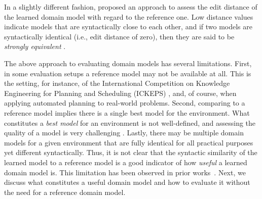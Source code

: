 \documentclass{article}
\theoremstyle{definition}
\theoremstyle{remark}
\newif\ifaddcomments
\newcommand{\roni}[1]{\ifaddcomments{\textcolor{red}{[Roni: #1]}}\fi}
\newcommand{\mauro}[1]{\ifaddcomments{\textcolor{green}{[Mauro: #1]}}\fi}
\begin{document}


In a slightly different fashion, \cite{chrpa2023comparing} proposed an approach to assess the edit distance of the learned domain model with regard to the reference one. Low distance values indicate models that are syntactically close to each other, and if two models are syntactically identical (i.e., edit distance of zero), then they are said to be \textit{strongly equivalent} \citep{chrpa2023comparing}.



The above approach to evaluating domain models has several limitations. 
First, in some evaluation setups a reference model may not be available at all. 
This is the setting, for instance, of the International Competition on Knowledge Engineering for Planning and Scheduling (ICKEPS) \citep{DBLP:journals/aim/ChrpaMVV17}, 
and, of course, when applying automated planning to real-world problems.
Second, comparing to a reference model implies there is a single best model for the environment. 
What constitutes a \emph{best model} for an environment is not well-defined, and assessing the quality of a model is very challenging \citep{DBLP:conf/kcap/McCluskeyVV17}. 
Lastly, there may be multiple domain models for a given environment that are fully identical for all practical purposes yet different syntactically. 
Thus, it is not clear that the syntactic similarity of the learned model to a reference model is a good indicator of how \emph{useful} a learned domain model is. This limitation has been observed in prior works~\citep{aineto2019learning,juba2021safe,mordoch2024safe}.
Next, we discuss what constitutes a useful domain model and how to evaluate it without the need for a reference domain model.
\end{document}
